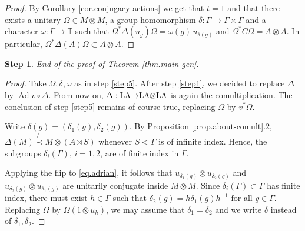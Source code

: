 \documentclass[a4paper,11pt]{amsart}
\numberwithin{equation}{section}
\newtheorem{step}{Step}[section]
\begin{document}
\begin{proof}
By Corollary \ref{cor.conjugacy-actions} we get that $t = 1$ and that there  exists a unitary $\Omega \in M {\mathbin{\overline{\otimes}}} M$, a group homomorphism $\delta : \Gamma {\rightarrow} \Gamma \times \Gamma$ and a character $\omega : \Gamma {\rightarrow} {\mathbb{T}}$ such that ${\Omega}^* {\Delta}(u_g) {\Omega} = {\omega}(g) \, u_{\delta(g)}$ and ${\Omega}^* C {\Omega} = A {\mathbin{\overline{\otimes}}} A$. In particular, ${\Omega}^* {\Delta}(A) {\Omega} \subset A {\mathbin{\overline{\otimes}}} A$.
\end{proof}

\begin{step}
End of the proof of Theorem \ref{thm.main-gen}.
\end{step}

\begin{proof}
Take ${\Omega},\delta,\omega$ as in step \ref{step5}. After step \ref{step1}, we decided to replace ${\Delta}$ by ${\operatorname{Ad}} v \circ {\Delta}$. From now on, ${\Delta} : {\mathord{\text{\rm L}}} \Lambda {\rightarrow} {\mathord{\text{\rm L}}} \Lambda {\mathbin{\overline{\otimes}}} {\mathord{\text{\rm L}}} \Lambda$ is again the comultiplication. The conclusion of step \ref{step5} remains of course true, replacing ${\Omega}$ by $v^* {\Omega}$.

Write $\delta(g) = (\delta_1(g),\delta_2(g))$. By Proposition \ref{prop.about-comult}.2, ${\Delta}(M) \not{\prec} M {\mathbin{\overline{\otimes}}} (A \rtimes S)$ whenever $S < \Gamma$ is of infinite index. Hence, the subgroups $\delta_i(\Gamma)$, $i=1,2$, are of finite index in $\Gamma$.

Applying the flip to \eqref{eq.adrian}, it follows that $u_{\delta_1(g)} {\otimes} u_{\delta_2(g)}$ and $u_{\delta_2(g)} {\otimes} u_{\delta_1(g)}$ are unitarily conjugate inside $M {\mathbin{\overline{\otimes}}} M$. Since $\delta_i(\Gamma) \subset \Gamma$ has finite index, there must exist $h \in \Gamma$ such that $\delta_2(g) = h \delta_1(g) h^{-1}$ for all $g \in \Gamma$. Replacing ${\Omega}$ by ${\Omega} (1 {\otimes} u_h)$, we may assume that $\delta_1 = \delta_2$ and we write $\delta$ instead of $\delta_1,\delta_2$.


\end{proof}
\end{document}

